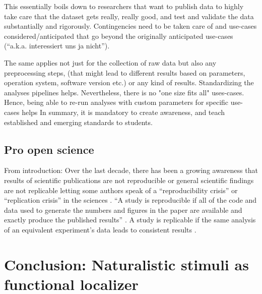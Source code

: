 %
This essentially boils down to researchers that want to publish data to highly
take care that the dataset gets really, really good, and test and validate the
data substantially and rigorously.
%
Contingencies need to be taken care of and use-cases considered/anticipated that
go beyond the originally anticipated use-cases (``a.k.a. interessiert uns ja
nicht'').

%
The same applies not just for the collection of raw data but also any
preprocessing steps, (that might lead to different results based on parameters,
operation system, software version etc.) or any kind of results.
%
Standardizing the analyses pipelines helps.
%
Nevertheless, there is no "one size fits all" uses-cases.
%
Hence, being able to re-run analyses with custom parameters for specific
use-cases helps
%
In summary, it is mandatory to create awareness, and teach established and
emerging standards to students.


\subsection{Pro open science}




From introduction:
Over the last decade, there has been a growing awareness that results of
scientific publications are not reproducible or general scientific findings are
not replicable letting some authors speak of a ``reproducibility crisis'' or
``replication crisis'' in the sciences \citep{baker2016reproducibility,
plesser2018reproducibility, stupple2019reproducibility, nosek2022replicability}.
``A study is reproducible if all of the code and data used to generate the
numbers and figures in the paper are available and exactly produce the published
results'' \citep{leek2017most}.
A study is replicable if the same analysis of an equivalent experiment's data
leads to consistent results \citep{dubois2016building, leek2017most}.


\section{Conclusion: Naturalistic stimuli as functional localizer}

